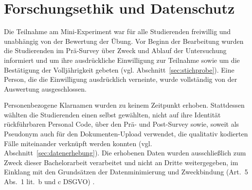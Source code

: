 \section{Forschungsethik und Datenschutz}
\label{sec:forschungsethik}
Die Teilnahme am Mini-Experiment war für alle Studierenden freiwillig und unabhängig von der
Bewertung der Übung. Vor Beginn der Bearbeitung wurden die Studierenden im Prä-Survey über Zweck und
Ablauf der Untersuchung informiert und um ihre ausdrückliche Einwilligung zur Teilnahme sowie um die
Bestätigung der Volljährigkeit gebeten (vgl. Abschnitt~\ref{sec:stichprobe}). Eine Person, die die
Einwilligung ausdrücklich verneinte, wurde vollständig von der Auswertung ausgeschlossen.

Personenbezogene Klarnamen wurden zu keinem Zeitpunkt erhoben. Stattdessen wählten die Studierenden
einen selbst gewählten, nicht auf ihre Identität rückführbaren Personal Code, über den Prä- und
Post-Survey sowie, soweit als Pseudonym auch für den Dokumenten-Upload verwendet, die qualitativ
kodierten Fälle miteinander verknüpft werden konnten (vgl. Abschnitt~\ref{sec:datenerhebung}). Die
erhobenen Daten wurden ausschließlich zum Zweck dieser Bachelorarbeit verarbeitet und nicht an
Dritte weitergegeben, im Einklang mit den Grundsätzen der Datenminimierung und Zweckbindung
(Art.~5 Abs.~1 lit.~b und c DSGVO) \cite{eu2016dsgvo}.
